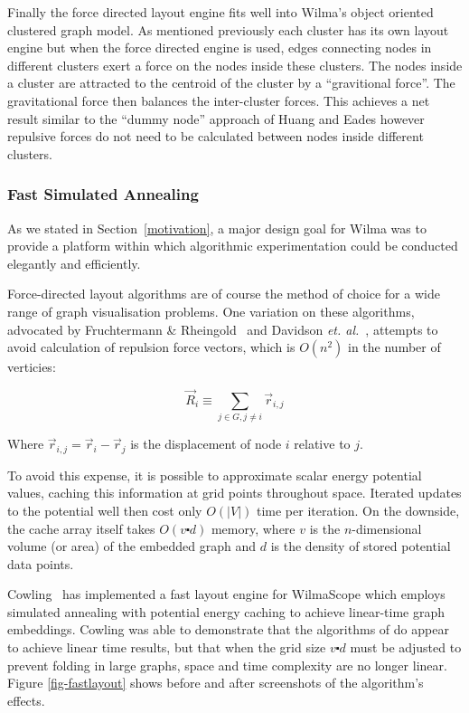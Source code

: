 \documentclass[runningheads]{cl2emult}
\begin{document}
Finally the force directed layout engine fits well into Wilma's object
oriented clustered graph model.  As mentioned previously each cluster
has its own layout engine but when the force directed engine is used,
edges connecting nodes in different clusters exert a force on
the nodes inside these clusters.  The nodes inside a cluster are
attracted to the centroid of the cluster by a ``gravitional force''.
The gravitational force then balances the inter-cluster forces.  This
achieves a net result similar to the ``dummy node'' approach of Huang
and Eades\cite{Huang:GD98} however repulsive forces do not need to be
calculated between nodes inside different clusters.

\subsubsection{Fast Simulated Annealing}

As we stated in Section~\ref{motivation}, a major design goal for Wilma
was to provide a platform within which algorithmic experimentation could be
conducted elegantly and efficiently.

Force-directed layout algorithms are of course the method of choice for a
wide range of graph visualisation problems.  One variation on these
algorithms, advocated by Fruchtermann \&
Rheingold~\cite{fruchtermann90force-directed} and Davidson {\em et.
al.}~\cite{davidson01noise}, attempts to avoid calculation of repulsion force
vectors, which is $O(n^2)$ in the number of verticies:  

\begin{equation}
\vec{R}_i \equiv \sum_{j \in G, j \neq i} \vec{r}_{i,j}
\end{equation}

\noindent Where $\vec{r}_{i,j} = \vec{r}_i - \vec{r}_j$ is the displacement
of node $i$ relative to $j$.

To avoid this expense, it is possible to approximate scalar energy potential
values, caching this information at grid points throughout space.  Iterated
updates to the potential well then cost only $O(|V|)$ time per iteration.  On
the downside, the cache array itself takes $O(v \centerdot d)$ memory, where
$v$ is the $n$-dimensional volume (or area) of the embedded graph and $d$ is
the density of stored potential data points.

Cowling~\cite{cowling02fast} has implemented a fast layout engine for
WilmaScope which employs simulated annealing with potential energy caching
to achieve linear-time graph embeddings.  Cowling was able to demonstrate
that the algorithms of \cite{davidson01noise} do appear to achieve linear
time results, but that when the grid size $v \centerdot d$ must be adjusted to
prevent folding in large graphs, space and time complexity are
no longer linear.  Figure \ref{fig-fastlayout} shows before and after
screenshots of the algorithm's effects.
\end{document}

